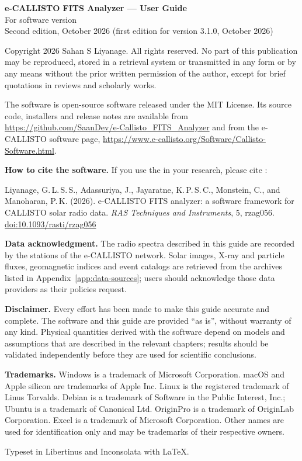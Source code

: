 \thispagestyle{empty}
\null\vfill
{\small\setlength{\parskip}{0.55\baselineskip}
\noindent\textsf{\textbf{e-CALLISTO FITS Analyzer --- User Guide}}\\
For software version \appversion\\
Second edition, October 2026 (first edition for version 3.1.0, October 2026)

\noindent Copyright \textcopyright{} 2026 Sahan S Liyanage. All rights reserved. No part of
this publication may be reproduced, stored in a retrieval system or transmitted in any
form or by any means without the prior written permission of the author, except for
brief quotations in reviews and scholarly works.

\noindent The \appname{} software is open-source software released under the MIT License.
Its source code, installers and release notes are available from
\url{https://github.com/SaanDev/e-Callisto_FITS_Analyzer} and from the e-CALLISTO software
page, \url{https://www.e-callisto.org/Software/Callisto-Software.html}.

\noindent\textsf{\textbf{How to cite the software.}} If you use the \appname{} in your
research, please cite \textcite{liyanage2026}:\\[2pt]
\hspace*{1em}\begin{minipage}[t]{0.94\linewidth}
Liyanage, G.\,L.\,S.\,S., Adassuriya, J., Jayaratne, K.\,P.\,S.\,C., Monstein, C., and
Manoharan, P.\,K. (2026). e-CALLISTO FITS analyzer: a software framework for CALLISTO
solar radio data. \emph{RAS Techniques and Instruments}, 5, rzag056.
\href{https://doi.org/10.1093/rasti/rzag056}{doi:10.1093/rasti/rzag056}
\end{minipage}

\noindent\textsf{\textbf{Data acknowledgment.}} The radio spectra described in this guide
are recorded by the stations of the e-CALLISTO network. Solar images, X-ray and particle
fluxes, geomagnetic indices and event catalogs are retrieved from the archives listed in
Appendix~\ref{app:data-sources}; users should acknowledge those data providers as their
policies request.

\noindent\textsf{\textbf{Disclaimer.}} Every effort has been made to make this guide accurate
and complete. The software and this guide are provided ``as is'', without warranty of any
kind. Physical quantities derived with the software depend on models and assumptions that
are described in the relevant chapters; results should be validated independently before
they are used for scientific conclusions.

\noindent\textsf{\textbf{Trademarks.}} Windows is a trademark of Microsoft Corporation. macOS
and Apple silicon are trademarks of Apple Inc. Linux is the registered trademark of Linus
Torvalds. Debian is a trademark of Software in the Public Interest, Inc.; Ubuntu is a
trademark of Canonical Ltd. OriginPro is a trademark of OriginLab Corporation. Excel is a
trademark of Microsoft Corporation. Other names are used for identification only and may
be trademarks of their respective owners.

\noindent Typeset in Libertinus and Inconsolata with \LaTeX.\par}
\clearpage
